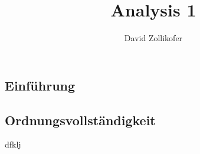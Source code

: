 \documentclass{sciposter}
\title{\huge{Analysis 1}}
\author{\large{David Zollikofer}}
\begin{document}
\selectfont



\maketitle



\begin{multicols}{3}


\section{Einführung}
\subsection{Ordnungsvollständigkeit}
dfklj

\newpage

\end{multicols}
\end{document}
